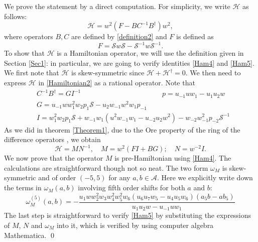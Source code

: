 \documentclass[fleqn,11pt,twoside]{article}
\makeatletter
\newcommand\cH{{\mathcal H}}
\newcommand\cS{{\mathcal S}}
\newcommand\cA{{\mathcal A}}
\renewenvironment{proof}[1][\proofname]{\par
  \normalfont
  \topsep6\p@\@plus6\p@ \trivlist
  \item[\hskip\labelsep\textbf{%
    #1\@addpunct{.}}]\ignorespaces
}{%
  \qed\endtrivlist
}
\theoremstyle{definition}
\makeatother
\begin{document}
	\begin{proof}
		We prove the statement by a direct computation. For simplicity, we write $\cH$ as follows:
		\begin{equation}
			\cH = w^2 \left( F - B C^{-1} B^\dagger \right)w^2,
			\label{HamilDeco}
		\end{equation}
where operators $B, C$ are defined by \eqref{definition2} and  $F$  is defined as
\begin{equation}
   F = \mathcal{S} w \mathcal{S} - \mathcal{S}^{-1}w
\mathcal{S}^{-1}.
\label{Definitions2}
\end{equation}
To show that $\cH$ is a Hamiltonian operator, we
will use the definition given in Section \ref{Sec1}: in particular, we are going to verify identities
\eqref{Ham4} and \eqref{Ham5}. We first note that $\cH$ is skew-symmetric since
$\cH + \cH^\dagger = 0$.
We then need to express $\cH$ in \eqref{Hamiltonian2} as a rational operator. Note that
\begin{subequations}
 \begin{align*}
  & C^{-1} B^\dagger = G I^{-1}\qquad\qquad\qquad\qquad\quad\qquad\;\; p = u_{-1} u w_1 - u_1 u_2 w\\
  & G = u_{-1} w w_1^2 w_2 p_1 \cS -u_2 w_{-1} w^2 w_1  p_{-1} \\
  & I =  w_1^2 w_2 p_1  \cS+ w_{-1} w_1 \left(u^2 w_{-1} w_1-u_{-2} u_2 w^2\right) - w_{-2} w_{-1}^2 p_{-2} \cS^{-1}
 \end{align*}
\end{subequations}
 As we did in theorem \ref{Theorem1}, due to the Ore property of the ring of the difference operators \cite{4}, we obtain
\begin{equation*}
  \cH =  M N^{-1}, \quad M = w^2\left(F I + B G\right); \quad N=w^{-2} I.
\end{equation*}
We now prove that the operator $M$ is pre-Hamiltonian using
\eqref{Ham4}. The calculations are straightforward though not so neat. The two form
 $\omega_M$ is skew-symmetric and of order $(-5,5)$ for any $a, b\in \cA$. Here we explicitly write down the terms in $\omega_M(a,b)$
 involving fifth order shifts for both $a$ and $b$:
\begin{equation*}
    \omega_M^{(5)}(a,b)=-\frac{u_1 w w_2^2 w_3 w_4^2 w_5^2
w_6 \left(u_6 u_7 w_5-u_4 u_5 w_6\right)\left(a_5 b-a b_5\right) }{u_1 u_2
w-u_{-1} u w_1}
\end{equation*}
The last step is straightforward to verify \eqref{Ham5} by substituting
 the expressions of $M$, $N$ and $\omega_M$ into it, which is verified by using
computer algebra Mathematica.
\end{proof}
\end{document}
